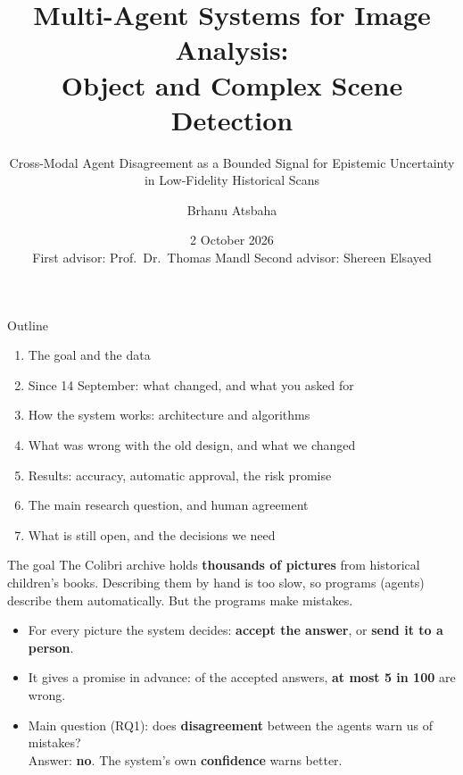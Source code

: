 \documentclass[aspectratio=169,11pt]{beamer}
\title{Multi-Agent Systems for Image Analysis:\\Object and Complex Scene Detection}
\subtitle{Cross-Modal Agent Disagreement as a Bounded Signal for Epistemic Uncertainty in Low-Fidelity Historical Scans}
\author{Brhanu Atsbaha}
\date{2 October 2026\\[6pt]
\small First advisor: Prof.\ Dr.\ Thomas Mandl \quad Second advisor: Shereen Elsayed}
\newcommand{\remark}[1]{\par\vspace{0.35cm}{\small\textcolor{grey}{#1}}}
\begin{document}
\begin{frame}[plain]
  \titlepage
\end{frame}

\begin{frame}{Outline}
\begin{enumerate}\setlength\itemsep{6pt}
  \item The goal and the data
  \item Since 14 September: what changed, and what you asked for
  \item How the system works: architecture and algorithms
  \item What was wrong with the old design, and what we changed
  \item Results: accuracy, automatic approval, the risk promise
  \item The main research question, and human agreement
  \item What is still open, and the decisions we need
\end{enumerate}
\end{frame}

\begin{frame}{The goal}
The Colibri archive holds \textbf{thousands of pictures} from historical children's books. Describing them by hand is too slow, so programs (agents) describe them automatically. But the programs make mistakes.
\vspace{0.3cm}
\begin{itemize}\setlength\itemsep{8pt}
  \item For every picture the system decides: \textbf{accept the answer}, or \textbf{send it to a person}.
  \item It gives a promise in advance: of the accepted answers, \textbf{at most 5 in 100} are wrong.
  \item Main question (RQ1): does \textbf{disagreement} between the agents warn us of mistakes?\\
        Answer: \textbf{no}. The system's own \textbf{confidence} warns better.
\end{itemize}
\remark{The contribution is not a better detector; it is knowing which answers can be trusted.}
\end{frame}
\end{document}
